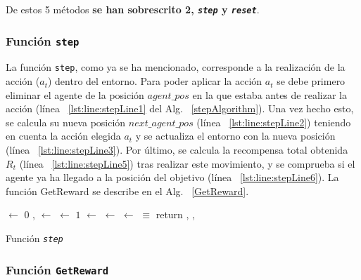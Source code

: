 De estos 5 métodos \textbf{se han sobrescrito 2, \textit{\texttt{step}} y \textit{\texttt{reset}}}. \\

\subsubsection{Función \texttt{step}}

La función \texttt{step}, como ya se ha mencionado, corresponde a la realización de la acción ($a_t$) dentro del entorno. Para poder aplicar la acción $a_t$ se debe primero eliminar el agente de la posición $agent\_pos$ en la que estaba antes de realizar la acción (línea ~\ref{lst:line:stepLine1} del Alg. ~\ref{stepAlgorithm}). Una vez hecho esto, se calcula su nueva posición $next\_agent\_pos$ (línea ~\ref{lst:line:stepLine2}) teniendo en cuenta la acción elegida $a_t$ y se actualiza el entorno con la nueva posición (línea ~\ref{lst:line:stepLine3}). Por último, se calcula la recompensa total obtenida $R_t$ (línea ~\ref{lst:line:stepLine5}) tras realizar este movimiento, y se comprueba si el agente ya ha llegado a la posición del objetivo (línea ~\ref{lst:line:stepLine6}). La función GetReward se describe en el Alg. ~\ref{GetReward}. 

\begin{algorithm}[H]
\SetAlgoLined
{}
\BlankLine
\State[\AgentPos] $\leftarrow$ $0$\;  \label{lst:line:stepLine1} 
\NextAgentPos, \Penalty $\leftarrow$ \GetNextPosition{\Action,\AgentPos}\;\label{lst:line:stepLine2} 
\State[\NextAgentPos] $\leftarrow$ $1$\; \label{lst:line:stepLine3} 
\NextState $\leftarrow$ \State\;
\Reward $\leftarrow$ \GetReward{\NextAgentPos, \Penalty}\;\label{lst:line:stepLine5} 
\Done $\leftarrow$ \NextAgentPos $\equiv$ \GoalPosition\; \label{lst:line:stepLine6}
return \NextState, \Reward, \Done\;
 \caption{Función \textit{\texttt{step}}} \label{stepAlgorithm}
\end{algorithm} 

\subsubsection{Función \texttt{GetReward}}

